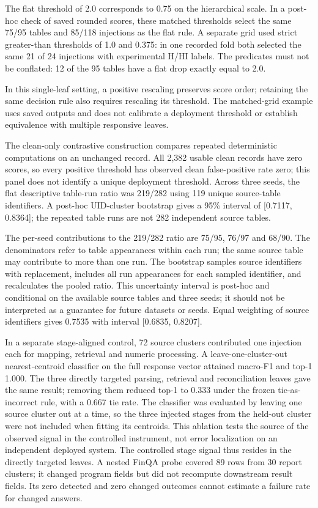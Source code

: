\documentclass[runningheads]{llncs}
\begin{document}
The flat threshold of 2.0 corresponds to 0.75 on the hierarchical scale.
In a post-hoc check of saved rounded scores, these matched thresholds
select the same 75/95 tables and 85/118 injections as the flat rule. A
separate grid used strict greater-than thresholds of 1.0 and 0.375: in
one recorded fold both selected the same 21 of 24 injections with
experimental H/HI labels. The predicates must not be conflated: 12 of
the 95 tables have a flat drop exactly equal to 2.0.

In this single-leaf setting, a positive rescaling preserves score order;
retaining the same decision rule also requires rescaling its threshold.
The matched-grid example uses saved outputs and does not calibrate a
deployment threshold or establish equivalence with multiple responsive
leaves.

The clean-only contrastive construction compares repeated deterministic
computations on an unchanged record. All 2,382 usable clean records have
zero scores, so every positive threshold has observed clean
false-positive rate zero; this panel does not identify a unique
deployment threshold. Across three seeds, the flat descriptive table-run
ratio was 219/282 using 119 unique source-table identifiers. A post-hoc
UID-cluster bootstrap gives a 95\% interval of {[}0.7117, 0.8364{]}; the
repeated table runs are not 282 independent source tables.

The per-seed contributions to the 219/282 ratio are 75/95, 76/97 and
68/90. The denominators refer to table appearances within each run; the
same source table may contribute to more than one run. The bootstrap
samples source identifiers with replacement, includes all run
appearances for each sampled identifier, and recalculates the pooled
ratio. This uncertainty interval is post-hoc and conditional on the
available source tables and three seeds; it should not be interpreted as
a guarantee for future datasets or seeds. Equal weighting of source
identifiers gives 0.7535 with interval {[}0.6835, 0.8207{]}.

In a separate stage-aligned control, 72 source clusters contributed one
injection each for mapping, retrieval and numeric processing. A
leave-one-cluster-out nearest-centroid classifier on the full response
vector attained macro-F1 and top-1 1.000. The three directly targeted
parsing, retrieval and reconciliation leaves gave the same result;
removing them reduced top-1 to 0.333 under the frozen tie-as-incorrect
rule, with a 0.667 tie rate. The classifier was evaluated by leaving one
source cluster out at a time, so the three injected stages from the
held-out cluster were not included when fitting its centroids. This
ablation tests the source of the observed signal in the controlled
instrument, not error localization on an independent deployed system.
The controlled stage signal thus resides in the directly targeted
leaves. A nested FinQA probe \cite{r10} covered 89 rows from 30 report
clusters; it changed program fields but did not recompute downstream
result fields. Its zero detected and zero changed outcomes cannot
estimate a failure rate for changed answers.
\end{document}
